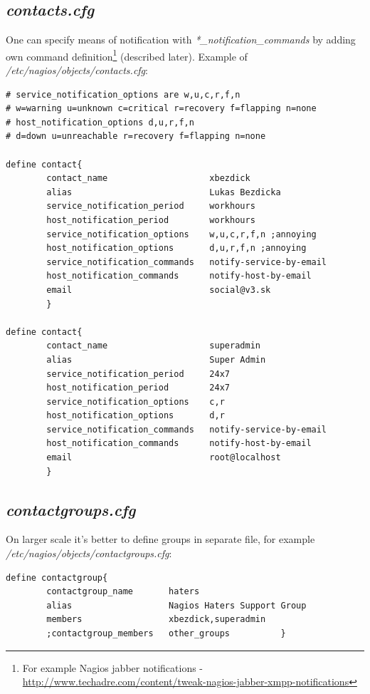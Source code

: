 \documentclass[10pt,a4paper,final]{report}
\begin{document}
\subsection{\emph{contacts.cfg}}
One can specify means of notification with \emph{*\_notification\_commands} by adding own command definition\footnote{For example Nagios jabber notifications -\url{http://www.techadre.com/content/tweak-nagios-jabber-xmpp-notifications}} (described later). Example of \emph{/etc/nagios/objects/contacts.cfg}:
\begin{lstlisting}
# service_notification_options are w,u,c,r,f,n
# w=warning u=unknown c=critical r=recovery f=flapping n=none
# host_notification_options d,u,r,f,n
# d=down u=unreachable r=recovery f=flapping n=none

define contact{
        contact_name                    xbezdick
        alias                           Lukas Bezdicka
        service_notification_period     workhours
        host_notification_period        workhours
        service_notification_options    w,u,c,r,f,n ;annoying
        host_notification_options       d,u,r,f,n ;annoying
        service_notification_commands   notify-service-by-email
        host_notification_commands      notify-host-by-email
        email                           social@v3.sk
        }

define contact{
        contact_name                    superadmin
        alias                           Super Admin
        service_notification_period     24x7
        host_notification_period        24x7
        service_notification_options    c,r
        host_notification_options       d,r
        service_notification_commands	notify-service-by-email
        host_notification_commands 		notify-host-by-email
        email                           root@localhost
        }
\end{lstlisting}

\subsection{\emph{contactgroups.cfg}}
On larger scale it's better to define groups in separate file, for example \emph{/etc/nagios/objects/contactgroups.cfg}:
\begin{lstlisting}
define contactgroup{
        contactgroup_name       haters
        alias                   Nagios Haters Support Group
        members                 xbezdick,superadmin
        ;contactgroup_members   other_groups	      }
\end{lstlisting}
\end{document}

